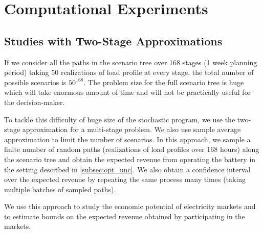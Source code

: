 \documentclass[11pt,twoside]{article}
\begin{document}
\section{Computational Experiments}\label{sec:exp}
\subsection{Studies with Two-Stage Approximations}
If we consider all the paths in the scenario tree over 168 stages (1 week planning period) taking 50 realizations of load profile at every stage, the total number of possible scenarios is $50^{168}$. The problem size for the full scenario tree is huge which will take enormous amount of time and will not be practically useful for the decision-maker. 

To tackle this difficulty of huge size of the stochastic program, we use the two-stage approximation for a multi-stage problem. We also use sample average approximation to limit the number of scenarios. In this approach, we sample a finite number of random paths (realizations of load profiles over 168 hours) along the scenario tree and obtain the expected revenue from operating the battery in the setting described in \ref{subsec:opt_unc}. We also obtain a confidence interval over the expected revenue by repeating the same process many times (taking multiple batches of sampled paths).

We use this approach to study the economic potential of electricity markets and to estimate bounds on the expected revenue obtained by participating in the markets.
\end{document}
